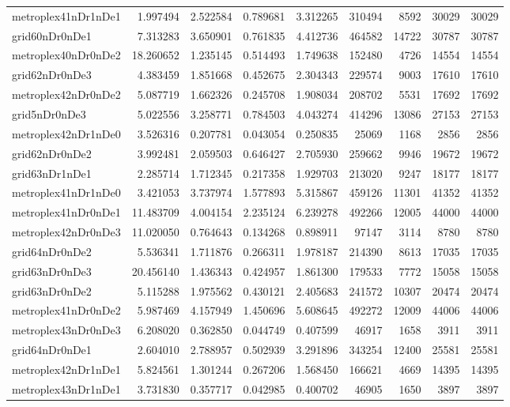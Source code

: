 \documentclass[../../../thesis.tex]{subfiles}
\begin{document}
\begin{longtable}{|l|r|r|r|r|r|r|r|r|}
metroplex41nDr1nDe1 & 1.997494 & 2.522584 & 0.789681 & 3.312265 & 310494 & 8592 & 30029 & 30029 \\
grid60nDr0nDe1 & 7.313283 & 3.650901 & 0.761835 & 4.412736 & 464582 & 14722 & 30787 & 30787 \\
metroplex40nDr0nDe2 & 18.260652 & 1.235145 & 0.514493 & 1.749638 & 152480 & 4726 & 14554 & 14554 \\
grid62nDr0nDe3 & 4.383459 & 1.851668 & 0.452675 & 2.304343 & 229574 & 9003 & 17610 & 17610 \\
metroplex42nDr0nDe2 & 5.087719 & 1.662326 & 0.245708 & 1.908034 & 208702 & 5531 & 17692 & 17692 \\
grid5nDr0nDe3 & 5.022556 & 3.258771 & 0.784503 & 4.043274 & 414296 & 13086 & 27153 & 27153 \\
metroplex42nDr1nDe0 & 3.526316 & 0.207781 & 0.043054 & 0.250835 & 25069 & 1168 & 2856 & 2856 \\
grid62nDr0nDe2 & 3.992481 & 2.059503 & 0.646427 & 2.705930 & 259662 & 9946 & 19672 & 19672 \\
grid63nDr1nDe1 & 2.285714 & 1.712345 & 0.217358 & 1.929703 & 213020 & 9247 & 18177 & 18177 \\
metroplex41nDr1nDe0 & 3.421053 & 3.737974 & 1.577893 & 5.315867 & 459126 & 11301 & 41352 & 41352 \\
metroplex41nDr0nDe1 & 11.483709 & 4.004154 & 2.235124 & 6.239278 & 492266 & 12005 & 44000 & 44000 \\
metroplex42nDr0nDe3 & 11.020050 & 0.764643 & 0.134268 & 0.898911 & 97147 & 3114 & 8780 & 8780 \\
grid64nDr0nDe2 & 5.536341 & 1.711876 & 0.266311 & 1.978187 & 214390 & 8613 & 17035 & 17035 \\
grid63nDr0nDe3 & 20.456140 & 1.436343 & 0.424957 & 1.861300 & 179533 & 7772 & 15058 & 15058 \\
grid63nDr0nDe2 & 5.115288 & 1.975562 & 0.430121 & 2.405683 & 241572 & 10307 & 20474 & 20474 \\
metroplex41nDr0nDe2 & 5.987469 & 4.157949 & 1.450696 & 5.608645 & 492272 & 12009 & 44006 & 44006 \\
metroplex43nDr0nDe3 & 6.208020 & 0.362850 & 0.044749 & 0.407599 & 46917 & 1658 & 3911 & 3911 \\
grid64nDr0nDe1 & 2.604010 & 2.788957 & 0.502939 & 3.291896 & 343254 & 12400 & 25581 & 25581 \\
metroplex42nDr1nDe1 & 5.824561 & 1.301244 & 0.267206 & 1.568450 & 166621 & 4669 & 14395 & 14395 \\
metroplex43nDr1nDe1 & 3.731830 & 0.357717 & 0.042985 & 0.400702 & 46905 & 1650 & 3897 & 3897 \\

\end{longtable}
\end{document}
